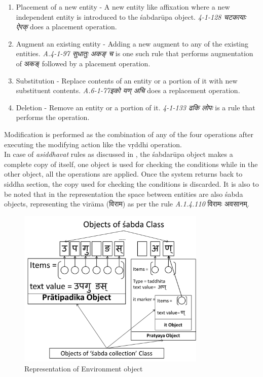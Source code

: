 \documentclass[a4paper,11pt,twoside,openright]{report}
\begin{document}
\renewcommand{\labelenumi}{$\Roman{enumi}$}
\begin{enumerate}
\item Placement of a new entity - A new entity like affixation where a new independent entity is introduced to the śabdarūpa object. \textsl{ 4-1-128 { \skt चटकायाः ऐरक्}} does a placement operation. 
\item Augment an existing entity - Adding a new augment to any of the existing entities. \textsl{ A.4-1-97 {\skt सुधातुः अकङ् च }} is one such rule that performs augmentation of {\skt अकङ्} followed by a placement operation. 
\item Substitution - Replace contents of an entity or a portion of it with new substituent contents. \textsl{ A.6-1-77{\skt  इको यण् अचि}} does a replacement operation. 
\item Deletion - Remove an entity or a portion of it. \textsl{ 4-1-133 {\skt ढकि लोपः}} is a rule that performs the operation.
\end{enumerate}
Modification is performed as the combination of any of the four operations after executing the modifying action like the vṛddhi operation.
\\
     In case of \textsl{ asiddhavat} rules as discussed in , the śabdarūpa object makes a complete copy of itself, one object is used for checking the conditions while in the other object, all the operations are applied. Once the system returns back to siddha section, the copy used for checking the conditions is discarded. It is also to be noted that in the representation the space between entities are also śabda objects, representing the virāma ({\skt विराम}) as per the rule \textsl{ A.1.4.110} {\skt विरामः अवसानम्}.



\begin{figure}[h]
    \centering
	\includegraphics[width=0.8\textwidth]{environment}
    \caption{Representation of Environment object}
    \label{fig:enc}
\end{figure}
\end{document}
